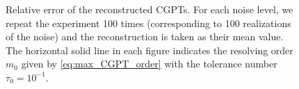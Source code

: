 \begin{figure}[htp]
  \centering
  \caption{Relative error of the reconstructed CGPTs. For each noise
    level, we repeat the experiment 100 times (corresponding to 100 realizations of the noise) and the
    reconstruction is taken as their mean value. The horizontal solid
    line in each figure indicates the resolving order $m_0$ given by
    \eqref{eq:max_CGPT_order} with the tolerance number $\tau_0=10^{-1}$.}
  \label{fig:err_rec_CGPT}
\end{figure}

